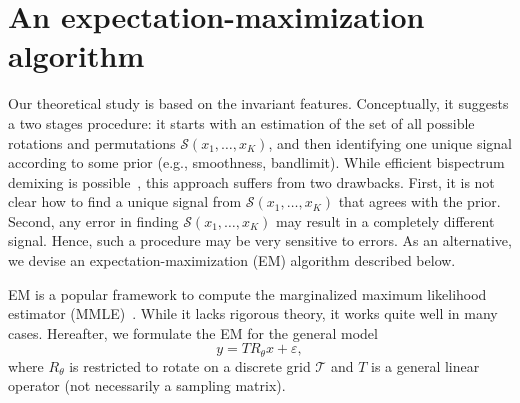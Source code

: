 \documentclass[english,12pt]{article}
\newcommand{\TODO}[1]{{\color{red}{[#1]}}}
\numberwithin{equation}{section}
\numberwithin{thm}{section} %
\begin{document}
\TODO{Here we should explain an important consequence: one can sub-sample the autocorrelation}




\section{An expectation-maximization algorithm }
\label{sec:EM}

Our theoretical study is based on the invariant features. Conceptually, it suggests a two stages procedure: it starts with an estimation of the set of all possible rotations and permutations $\mathcal{S}(x_1,\ldots,x_K)$, and then identifying one unique signal according to some prior (e.g., smoothness, bandlimit).
While efficient bispectrum demixing is possible~\cite{boumal2018heterogeneous,weinthesis}, this approach suffers from two drawbacks. First, it is not clear how to find a unique signal from $\mathcal{S}(x_1,\ldots,x_K)$ that agrees with the prior.  Second, any error in finding $\mathcal{S}(x_1,\ldots,x_K)$ may result in a  completely different signal. Hence, such a procedure may be very sensitive to errors. 
As an alternative, we devise an expectation-maximization (EM) algorithm described below. 

EM is a popular  framework to compute the marginalized maximum likelihood estimator (MMLE)~\cite{dempster1977maximum}. While it lacks rigorous theory, it works quite well in many cases. 
Hereafter, we formulate the EM for the general model
\begin{equation}
y = T R_\theta x + \varepsilon, 
\end{equation}
where $R_\theta$ is restricted to rotate on a discrete grid $\mathcal{T}$ and $T$  is a general linear operator (not necessarily a sampling matrix).
\end{document}
